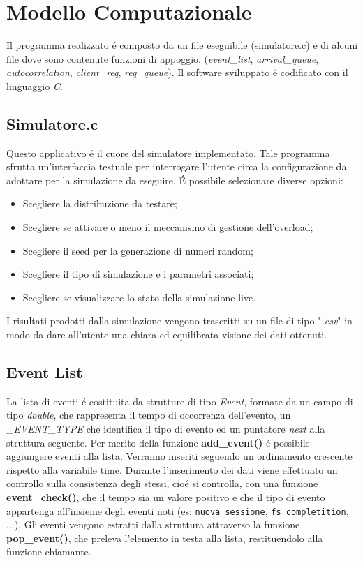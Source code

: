 \chapter{Modello Computazionale}
Il programma realizzato \'e composto da un file eseguibile (simulatore.c) e di 
alcuni file dove sono contenute funzioni di appoggio. (\textit{event\_list}, 
\textit{arrival\_queue}, \textit{autocorrelation}, \textit{client\_req}, 
\textit{req\_queue}).
Il software sviluppato \'e codificato con il linguaggio \textit{C}.

\section{Simulatore.c}

Questo applicativo \'e il cuore del simulatore implementato. Tale programma 
sfrutta un'interfaccia testuale per interrogare l'utente circa la 
configurazione 
da adottare per la simulazione da eseguire. 
\'E possibile selezionare diverse opzioni:
\begin{itemize}
\item Scegliere la distribuzione da testare;
\item Scegliere se attivare o meno il meccanismo di gestione dell'overload;
\item Scegliere il seed per la generazione di numeri random;
\item Scegliere il tipo di simulazione e i parametri associati;
\item Scegliere se visualizzare lo stato della simulazione live.
\end{itemize}

I risultati prodotti dalla simulazione vengono trascritti su un file di tipo 
"\textit{.csv}"  in modo da dare all'utente una chiara ed equilibrata visione 
dei dati ottenuti.

\section{Event List}
La lista di eventi \'e costituita da strutture di tipo \textit{Event}, formate 
da un campo di tipo \textit{double}, che rappresenta il tempo 
di occorrenza dell'evento, un \textit{\_EVENT\_TYPE} che identifica il tipo di 
evento 
ed un puntatore \textit{next} alla struttura seguente.
Per merito della funzione \textbf{add\_event()} \'e possibile aggiungere eventi 
alla lista. Verranno inseriti seguendo un ordinamento crescente rispetto alla 
variabile time. Durante l'inserimento dei dati viene effettuato un controllo 
sulla consistenza degli stessi, cio\'e si controlla, con una funzione 
\textbf{event\_check()}, che il tempo sia un valore positivo e che il tipo di 
evento appartenga all'insieme degli eventi noti (es: \texttt{nuova sessione}, 
\texttt{fs completition}, ...).     
Gli eventi vengono estratti dalla struttura attraverso la funzione 
\textbf{pop\_event()}, che preleva l'elemento in testa alla lista, 
restituendolo 
alla funzione chiamante.

